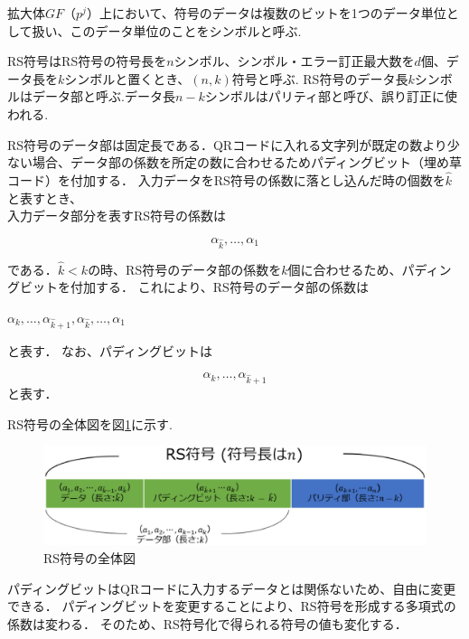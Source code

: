 \documentclass{thesis}
\begin{document}
拡大体$GF（p^j）$上において、符号のデータは複数のビットを1つのデータ単位として扱い、このデータ単位のことをシンボルと呼ぶ.

RS符号はRS符号の符号長を$n$シンボル、シンボル・エラー訂正最大数を$d$個、データ長を$k$シンボルと置くとき、$(n,k)$符号と呼ぶ.
RS符号のデータ長$k$シンボルはデータ部と呼ぶ.データ長$n-k$シンボルはパリティ部と呼び、誤り訂正に使われる.


RS符号のデータ部は固定長である．QRコードに入れる文字列が既定の数より少ない場合、データ部の係数を所定の数に合わせるためパディングビット（埋め草コード）を付加する．
入力データをRS符号の係数に落とし込んだ時の個数を$\hat{k}$と表すとき、\\
入力データ部分を表すRS符号の係数は

\begin{equation}
\alpha_{\hat{k}},…,\alpha_1
\label{eq:pol1}
\end{equation}

である．$\hat{k} < k$の時、RS符号のデータ部の係数を$k$個に合わせるため、パディングビットを付加する．
これにより、RS符号のデータ部の係数は

\begin{center}
$\alpha_{k},…,\alpha_{\hat{k} + 1},\alpha_{\hat{k}},…,\alpha_1$
\end{center}
と表す．
なお、パディングビットは
 
 \begin{equation}
 \alpha_{k},…,\alpha_{\hat{k} + 1}
\label{eq:pol3}
\end{equation}
と表す．\\

\newpage

RS符号の全体図を図\ref{RScode}に示す.

\begin{figure}[H]
 \centering
 \includegraphics[width=1\linewidth]{pic/RScode.eps}
 \caption{RS符号の全体図\label{RScode}}
\end{figure}

パディングビットはQRコードに入力するデータとは関係ないため、自由に変更できる．
パディングビットを変更することにより、RS符号を形成する多項式の係数は変わる．
そのため、RS符号化で得られる符号の値も変化する．
\end{document}
